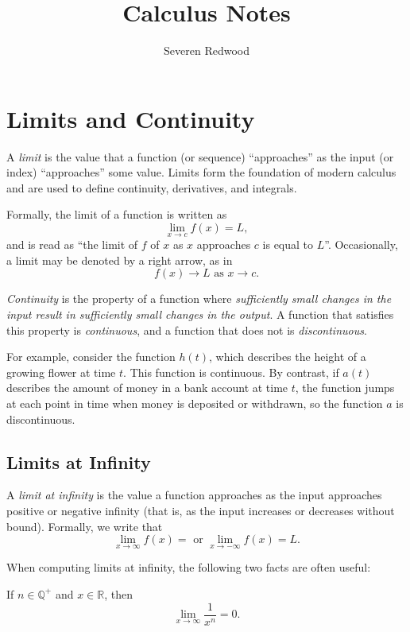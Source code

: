 \documentclass[headings=standardclasses]{scrreprt}
\title{Calculus Notes}
\author{Severen Redwood}
\begin{document}
\maketitle

\tableofcontents

\chapter{Limits and Continuity}

A \emph{limit} is the value that a function (or sequence) \enquote{approaches}
as the input (or index) \enquote{approaches} some value. Limits form the
foundation of modern calculus and are used to define continuity, derivatives,
and integrals.

Formally, the limit of a function is written as \[ \lim_{x → c} f(x) = L, \] and
is read as \enquote{the limit of \(f\) of \(x\) as \(x\) approaches \(c\) is
  equal to \(L\)}. Occasionally, a limit may be denoted by a right arrow, as
in \[ f(x) → L \text{ as } x → c. \]

\emph{Continuity} is the property of a function where \emph{sufficiently small
  changes in the input result in sufficiently small changes in the output}. A
function that satisfies this property is \emph{continuous}, and a function that
does not is \emph{discontinuous}.

For example, consider the function \(h(t)\), which describes the height of a
growing flower at time \(t\). This function is continuous. By contrast, if
\(a(t)\) describes the amount of money in a bank account at time \(t\), the
function jumps at each point in time when money is deposited or withdrawn, so
the function \(a\) is discontinuous.

\section{Limits at Infinity}

A \emph{limit at infinity} is the value a function approaches as the input
approaches positive or negative infinity (that is, as the input increases or
decreases without bound). Formally, we write that
\[ \lim_{x → ∞} f(x) = \text{ or } \lim_{x → -∞} f(x) = L. \]

When computing limits at infinity, the following two facts are often useful:

\begin{nfact}
  If \(n ∈ ℚ^{+}\) and \(x ∈ ℝ\), then
  \[ \lim_{x → ∞} \frac{1}{x^{n}} = 0. \]
\end{nfact}
\end{document}
